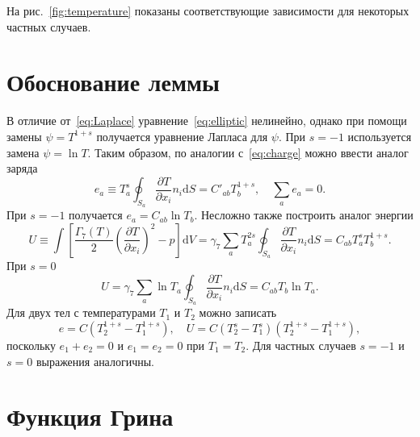 \documentclass{article}
\theoremstyle{plain}
\newcommand{\dd}{\mathrm{d}}
\newcommand{\pder}[2][]{\frac{\partial#1}{\partial#2}}
\newcommand{\eqdef}{\equiv}
\begin{document}
На рис.~\ref{fig:temperature} показаны соответствующие зависимости для некоторых частных случаев.

\section{Обоснование леммы}

В отличие от~\eqref{eq:Laplace} уравнение~\eqref{eq:elliptic} нелинейно,
однако при помощи замены \(\psi=T^{1+s}\) получается уравнение Лапласа для \(\psi\).
При \(s=-1\) используется замена \(\psi=\ln{T}\).
Таким образом, по аналогии с~\eqref{eq:charge} можно ввести аналог заряда
\begin{equation}\label{eq:charge_ell}
    e_a \eqdef T_a^s \oint_{S_a} \pder[T]{x_i}n_i\dd{S} = C'_{ab} T_b^{1+s}, \quad \sum_a e_a = 0.
\end{equation}
При \(s=-1\) получается \(e_a = C_{ab} \ln{T_b}\).
Несложно также построить аналог энергии
\begin{equation}\label{eq:energy_ell}
    U \eqdef \int \left[ \frac{\Gamma_7(T)}2\left(\pder[T]{x_i}\right)^2 - p \right]\dd{V} =
    \gamma_7 \sum_a T_a^{2s} \oint_{S_a} \pder[T]{x_i}n_i\dd{S} =
    C_{ab} T_a^s T_b^{1+s}.
\end{equation}
При \(s=0\)
\begin{equation}\label{eq:energy_ell0}
    U = \gamma_7 \sum_a \ln{T_a} \oint_{S_a} \pder[T]{x_i}n_i\dd{S} = C_{ab} T_b \ln{T_a}.
\end{equation}
Для двух тел с температурами \(T_1\) и \(T_2\) можно записать
\begin{equation}\label{eq:two_bodies}
    e = C \left( T_2^{1+s} - T_1^{1+s} \right), \quad
    U = C \left( T_2^s - T_1^s \right)\left( T_2^{1+s} - T_1^{1+s} \right),
\end{equation}
поскольку \(e_1+e_2=0\) и \(e_1=e_2=0\) при \(T_1=T_2\).
Для частных случаев \(s=-1\) и \(s=0\) выражения аналогичны.

\section{Функция Грина}
\end{document}
